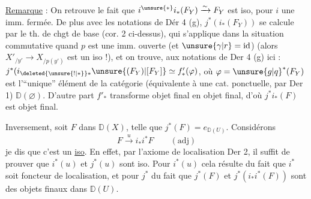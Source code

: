 \uline{Remarque} : On retrouve le fait que $i^{\unsure{*}}i_*(F_Y)\xrightarrow{\sim}F_Y$ est iso, pour $i$ une imm. fermée.  De plus avec les notations de Dér 4 (g),   $j^*(i_*(F_Y))$ se calcule par le th. de chgt de base (cor. 2 ci-dessus), qui s'applique dans la situation commutative
quand $p$ est une imm. ouverte (et $\unsure{\gamma|r}=\mathrm{id}$) (alors $X'_{/y'}\to X_{/p(y')}$ est \unsure{$=$} un iso !), et on trouve,  aux notations de Der 4 (g)
ici : $j^*(i_{\deleted{\unsure{!|*}}*}\unsure{(F_Y)|[F_Y]}\simeq f'_*(\varphi)$, où $\varphi=\unsure{g|q}^*(F_Y)$ est l'``unique'' élément de la catégorie (équivalente à une cat. ponctuelle, par Der 1) $\mathbb D(\varnothing)$. D'autre part $f'_*$ transforme objet final en objet final, d'où $j^*i_*(F)$ est objet final.

Inversement, soit $F$ dans $\mathbb D(X)$, telle que $j^*(F)=e_{\mathbb D(U)}$. Considérons
\[
 F\xrightarrow{u}i_*i^*F\qquad(\mathrm{adj})
\]
je dis que c'est un \uline{iso}. En effet, par l'axiome
de localisation Der 2, il suffit de prouver que $i^*(u)$ et $j^*(u)$ sont iso. Pour $i^*(u)$ cela résulte du fait que $i^*$ soit foncteur de localisation, et pour $j^*$ du  fait que $j^*(F)$ et $j^*(i_*i^*(F))$ sont des objets finaux dans $\mathbb D(U)$.


